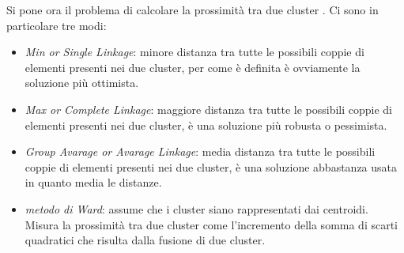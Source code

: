 Si pone ora il problema di calcolare la prossimità tra due cluster . Ci sono in particolare tre modi:
\begin{itemize}
	\item  \textit{Min or Single Linkage}: minore distanza tra tutte le possibili coppie di elementi presenti nei due cluster, per come è definita è ovviamente la soluzione più ottimista.
	\item \textit{Max or Complete Linkage}: maggiore distanza tra tutte le possibili coppie di elementi presenti nei due cluster, è una soluzione più robusta o pessimista.
	\item \textit{Group Avarage or Avarage Linkage}: media distanza tra tutte le possibili coppie di elementi presenti nei due cluster, è una soluzione abbastanza usata in quanto media le distanze.
	\item \textit{metodo di Ward}: assume che i cluster siano rappresentati dai centroidi. Misura la prossimità tra due cluster come l'incremento della somma di scarti quadratici che risulta dalla fusione di due cluster.
\end{itemize}
